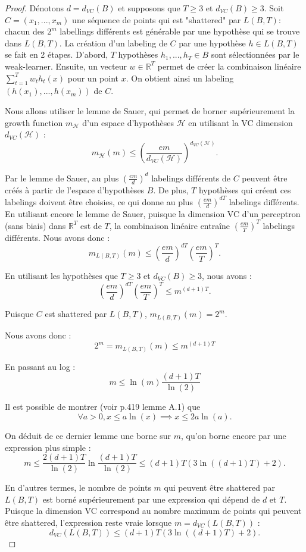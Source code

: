 \documentclass[12pt]{article}
\newcommand{\R}{\mathbb{R}}
\begin{document}
	\begin{proof}
	
	Dénotons $d = d_{VC}(B)$ et supposons que $T \geq 3$ et $d_{VC}(B) \geq 3$.
	Soit $C = (x_1, ..., x_m)$ une séquence de points qui est "shattered" par $L(B, T)$: chacun des $2^m$ labellings différents est générable par une hypothèse qui se trouve dans $L(B, T)$.
	La création d'un labeling de $C$ par une hypothèse $h \in L(B, T)$ se fait en 2 étapes.
	D'abord, $T$ hypothèses $h_1, ..., h_T \in B$ sont sélectionnées par le weak-learner.
	Ensuite, un vecteur $w \in \R^T$ permet de créer la combinaison linéaire $\sum_{t=1}^T w_t h_t(x)$ pour un point $x$.
	On obtient ainsi un labeling $(h(x_1), ..., h(x_m))$ de $C$.
	
	Nous allons utiliser le lemme de Sauer, qui permet de borner supérieurement la growth function $m_{\mathcal{H}}$ d'un espace d'hypothèses $\mathcal{H}$ en utilisant la VC dimension $d_{VC}(\mathcal{H})$ :
	\[
	m_{\mathcal{H}}(m) \leq \left( \frac{em}{d_{VC}(\mathcal{H})} \right) ^{d_{VC}(\mathcal{H})}.
	\]
	
	Par le lemme de Sauer, au plus $\left( \frac{em}{d} \right)^{d}$ labelings différents de $C$ peuvent être créés à partir de l'espace d'hypothèses $B$.
	De plus, $T$ hypothèses qui créent ces labelings doivent être choisies, ce qui donne au plus $\left( \frac{em}{d} \right) ^{d T}$ labelings différents.
	En utilisant encore le lemme de Sauer, puisque la dimension VC d'un perceptron (sans biais) dans $\R^T$ est de $T$, la combinaison linéaire entraîne $\left( \frac{em}{T} \right)^{T}$ labelings différents.
	Nous avons donc :
	\[
	m_{L(B, T)}(m) \leq \left( \frac{em}{d} \right) ^{d T} \left( \frac{em}{T} \right)^{T}.
	\]
	
	En utilisant les hypothèses que $T \geq 3$ et $d_{VC}(B) \geq 3$, nous avons :
	\[
	\left( \frac{em}{d} \right) ^{d T} \left( \frac{em}{T} \right)^{T} \leq m^{(d + 1) T}.
	\]
	
	Puisque $C$ est shattered par $L(B, T)$, $m_{L(B, T)}(m) = 2^m$.
	
	Nous avons donc :
	\[
	2^m = m_{L(B, T)}(m) \leq m^{(d + 1) T}
	\]
	
	En passant au log :
	\[
	m \leq \ln(m) \frac{(d + 1) T}{\ln(2)}
	\]
	
	Il est possible de montrer (voir \cite{Shalev-Shwartz2014-ba} p.419 lemme A.1) que
	\[
	\forall a > 0, x \leq a \ln(x) \implies x \leq 2 a \ln(a).
	\]
	
	On déduit de ce dernier lemme une borne sur $m$, qu'on borne encore par une expression plus simple :
	\[
	m \leq \frac{2 (d + 1) T}{\ln(2)} \ln \frac{(d + 1) T}{\ln(2)} \leq (d + 1) T (3 \ln((d + 1) T) + 2).
	\]
	
	En d'autres termes, le nombre de points $m$ qui peuvent être shattered par $L(B, T)$ est borné supérieurement par une expression qui dépend de $d$ et $T$.
	Puisque la dimension VC correspond au nombre maximum de points qui peuvent être shattered, l'expression reste vraie lorsque $m = d_{VC}(L(B, T))$ :
	\[
	d_{VC}(L(B, T)) \leq (d + 1) T (3 \ln((d + 1) T) + 2).
	\]
	\end{proof}
\end{document}
